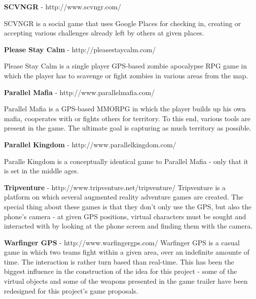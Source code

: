\textbf{SCVNGR} - http://www.scvngr.com/\newline

SCVNGR is a social game that uses Google Places for checking in, creating or
accepting various challenges already left by others at given places.\newline

\textbf{Please Stay Calm} - http://pleasestaycalm.com/ \newline

Please Stay Calm is a single player GPS-based zombie apocalypse RPG game in
which the player has to scavenge or fight zombies in various areas from the
map.\newline


\textbf{Parallel Mafia} - http://www.parallelmafia.com/ \newline

Parallel Mafia is a GPS-based MMORPG in which the player builds up his own
mafia, cooperates with or fights others for territory. To this end, various tools
are present in the game. The ultimate goal is capturing as much territory as
possible.\newline

\textbf{Parallel Kingdom} - http://www.parallelkingdom.com/ \newline

Paralle Kingdom is a conceptually identical game to Parallel Mafia - only that
it is set in the middle ages.\newline

\textbf{Tripventure} - http://www.tripventure.net/tripventure/ \newline
Tripventure is a platform on which several augmented reality adventure games are
created. The special thing about these games is that they don't only use the
GPS, but also the phone's camera - at given GPS positions, virtual characters
must be sought and interacted with by looking at the phone screen and finding
them with the camera.\newline


\textbf{Warfinger GPS} - http://www.warfingergps.com/ \newline
Warfinger GPS is a casual game in which two teams fight within a given area,
over an indefinite amounte of time. The interaction is rather turn based than
real-time. This has been the biggest influence in the construction of the idea
for this project - some of the virtual objects and some of the weapons presented
in the game trailer have been redesigned for this project's game
proposals.\newline

